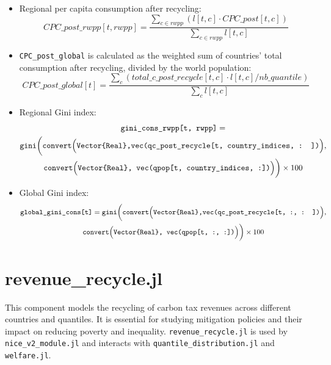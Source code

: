 \documentclass[
]{article}
\begin{document}
\begin{itemize}
\item
  Regional per capita consumption after recycling:
  \begin{equation}
  CPC\_post\_rwpp[t, rwpp] = \frac{\sum_{c \in rwpp} (l[t, c] \cdot CPC\_post[t, c])}{\sum_{c \in rwpp} l[t, c]}
  \end{equation}
\item
  \texttt{CPC\_post\_global} is calculated as the weighted sum of
  countries' total consumption after recycling, divided by the world
  population:
  \begin{equation}
  CPC\_post\_global[t] = \frac{\sum_c (total\_c\_post\_recycle[t, c] \cdot l[t, c] / nb\_quantile)}{\sum_c l[t, c]}
  \end{equation}
\item
  Regional Gini index: 
  \begin{multline} 
    \texttt{gini\_cons\_rwpp[t,\ rwpp]} = \\
    \texttt{gini} \biggl( \texttt{convert} \Bigl( \texttt{Vector\{Real\},} \texttt{vec(qc\_post\_recycle[t,\ country\_indices,\ : ])} \Bigr), \\
    \texttt{convert} \Bigl( \texttt{Vector\{Real\},\ vec(qpop[t,\ country\_indices,\ :])} \Bigr) \biggr) \times 100
    \end{multline}

\item
  Global Gini index: 
  \begin{multline} 
    \texttt{global\_gini\_cons{[}t{]}} = \texttt{gini} \biggl( \texttt{convert} \Bigl( \texttt{Vector\{Real\},} \texttt{vec(qc\_post\_recycle[t,\ :,\ : ])} \Bigr), \\
    \texttt{convert} \Bigl( \texttt{Vector\{Real\},\ vec(qpop[t,\ :,\ :])} \Bigr) \biggr) \times 100
    \end{multline}

\end{itemize}

\section{revenue\_recycle.jl}\label{revenue_recycle.jl}

This component models the recycling of carbon tax revenues across
different countries and quantiles. It is essential for studying
mitigation policies and their impact on reducing poverty and inequality.
\texttt{revenue\_recycle.jl} is used by \texttt{nice\_v2\_module.jl}
and interacts with \texttt{quantile\_distribution.jl} and
\texttt{welfare.jl}.
\end{document}
